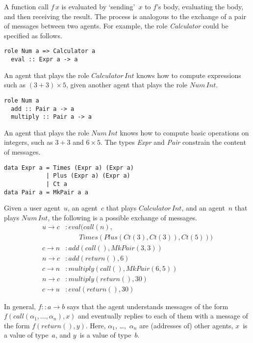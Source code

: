 \documentclass[conference,compsoc]{IEEEtran} %
\begin{document}
A function call $f\,x$ is evaluated by `sending'~$x$ to $f$'s body,
evaluating the body, and then receiving the result. The process is
analogous to the exchange of a pair of messages between two agents. For
example, the role \textit{Calculator} could be specified as follows.
\begin{lstlisting}[style=me]
role Num a => Calculator a
  eval :: Expr a -> a
\end{lstlisting}
An agent that plays the role $\mathit{Calculator}\,\mathit{Int}$ knows
how to compute expressions such as $(3+3)\times5$, given another agent
that plays the role $\mathit{Num}\,\mathit{Int}$.
\begin{lstlisting}[style=me]
role Num a
  add :: Pair a -> a
  multiply :: Pair a -> a
\end{lstlisting}
An agent that plays the role $\mathit{Num}\,\mathit{Int}$ knows how to
compute basic operations on integers, such as $3+3$ and $6\times5$. The
types \textit{Expr} and \textit{Pair} constrain the content of messages.
\begin{lstlisting}[style=hs]
data Expr a = Times (Expr a) (Expr a) 
            | Plus (Expr a) (Expr a) 
            | Ct a
data Pair a = MkPair a a
\end{lstlisting}
Given a user agent~$u$, an agent~$c$ that plays
$\mathit{Calculator}\,\mathit{Int}$, and an agent~$n$ that plays
$\mathit{Num}\,\mathit{Int}$, the following is a possible exchange of
messages.
\begin{align*}
u\to c &: 
  \mathit{eval}(\mathit{call}(n),\\
  &\qquad\mathit{Times}(
    \mathit{Plus}(\mathit{Ct}(3),\mathit{Ct}(3)),\mathit{Ct}(5)))\\
c\to n &: \mathit{add}(\mathit{call}(), \mathit{MkPair}(3, 3))\\
n\to c &: \mathit{add}(\mathit{return}(), 6)\\
c\to n &: \mathit{multiply}(\mathit{call}(), \mathit{MkPair}(6, 5))\\
n\to c &: \mathit{multiply}(\mathit{return}(), 30)\\
c\to u &: \mathit{eval}(\mathit{return}(), 30)
\end{align*}

In general, $f::a\to b$ says that the agent understands messages of the
form $f(\mathit{call}(\alpha_1,\ldots,\alpha_n),x)$ and eventually replies
to each of them with a message of the form $f(\mathit{return}(),y)$. Here,
$\alpha_1$, \dots,~$\alpha_n$ are (addresses of) other agents, $x$~is a
value of type~$a$, and $y$~is a value of type~$b$.
\end{document}
